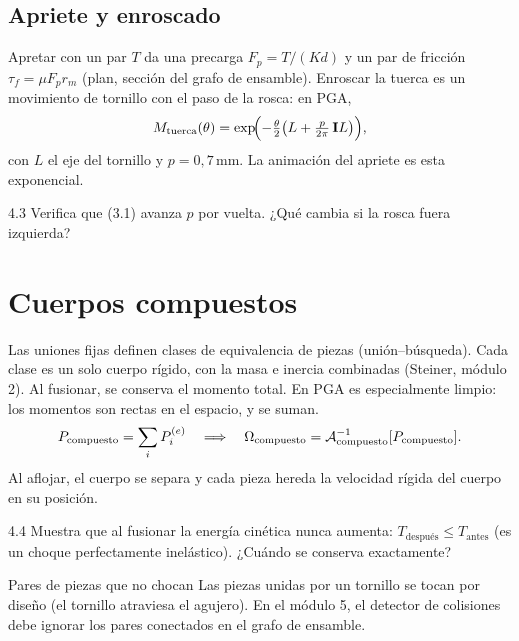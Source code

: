 \documentclass[11pt,a4paper]{article}
\begin{document}
\subsection{Apriete y enroscado}
Apretar con un par $T$ da una precarga $F_p = T/(Kd)$ y un par de fricción $\tau_f = \mu F_p r_m$ (plan, sección del
grafo de ensamble). Enroscar la tuerca es un movimiento de tornillo con el paso de la rosca: en PGA,
\begin{equation}
  M_{\text{tuerca}}(\theta) = \exp\!\Bigl(-\tfrac{\theta}{2}\bigl(L + \tfrac{p}{2\pi}\,\mathbf{I} L\bigr)\Bigr),
\end{equation}
con $L$ el eje del tornillo y $p = 0{,}7$\,mm. La animación del apriete es esta exponencial.

\begin{ejercicio}{4.3}
Verifica que (3.1) avanza $p$ por vuelta. ¿Qué cambia si la rosca fuera izquierda?
\end{ejercicio}

\section{Cuerpos compuestos}

Las uniones fijas definen clases de equivalencia de piezas (unión–búsqueda). Cada clase es un solo cuerpo rígido, con
la masa e inercia combinadas (Steiner, módulo 2). Al fusionar, se conserva el momento total. En PGA es especialmente
limpio: los momentos son rectas en el espacio, y se suman.
\begin{equation}
  P_{\text{compuesto}} = \sum_i P_i^{(e)}\quad\Longrightarrow\quad \Omega_{\text{compuesto}} = \mathcal{A}_{\text{compuesto}}^{-1}[P_{\text{compuesto}}].
\end{equation}
Al aflojar, el cuerpo se separa y cada pieza hereda la velocidad rígida del cuerpo en su posición.

\begin{ejercicio}{4.4}
Muestra que al fusionar la energía cinética nunca aumenta: $T_{\text{después}}\le T_{\text{antes}}$ (es un choque
perfectamente inelástico). ¿Cuándo se conserva exactamente?
\end{ejercicio}

\begin{nota}{Pares de piezas que no chocan}
Las piezas unidas por un tornillo se tocan por diseño (el tornillo atraviesa el agujero). En el módulo 5, el detector
de colisiones debe ignorar los pares conectados en el grafo de ensamble.
\end{nota}
\end{document}
